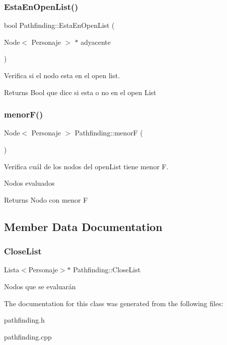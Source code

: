 \subsubsection{\texorpdfstring{Esta\+En\+Open\+List()}{EstaEnOpenList()}}
{\footnotesize\ttfamily bool Pathfinding\+::\+Esta\+En\+Open\+List (\begin{DoxyParamCaption}\item[{Node$<$ Personaje $>$ $\ast$}]{adyacente }\end{DoxyParamCaption})}



Verifica si el nodo esta en el open list. 

\begin{DoxyReturn}{Returns}
Bool que dice si esta o no en el open List 
\end{DoxyReturn}
\mbox{\label{classPathfinding_a217eb48e0c971eee607edc5b2a5ea3ba}} 
\subsubsection{\texorpdfstring{menor\+F()}{menorF()}}
{\footnotesize\ttfamily Node$<$ Personaje $>$ Pathfinding\+::menorF (\begin{DoxyParamCaption}{ }\end{DoxyParamCaption})}



Verifica cuál de los nodos del open\+List tiene menor F. 

Nodos evaluados \begin{DoxyReturn}{Returns}
Nodo con menor F 
\end{DoxyReturn}


\subsection{Member Data Documentation}
\mbox{\label{classPathfinding_a8b4acb83403fad6e58c515754bbb66d1}} 
\subsubsection{\texorpdfstring{Close\+List}{CloseList}}
{\footnotesize\ttfamily Lista$<$Personaje$>$$\ast$ Pathfinding\+::\+Close\+List}

Nodos que se evaluarán 

The documentation for this class was generated from the following files\+:\begin{DoxyCompactItemize}
\item 
pathfinding.\+h\item 
pathfinding.\+cpp\end{DoxyCompactItemize}
